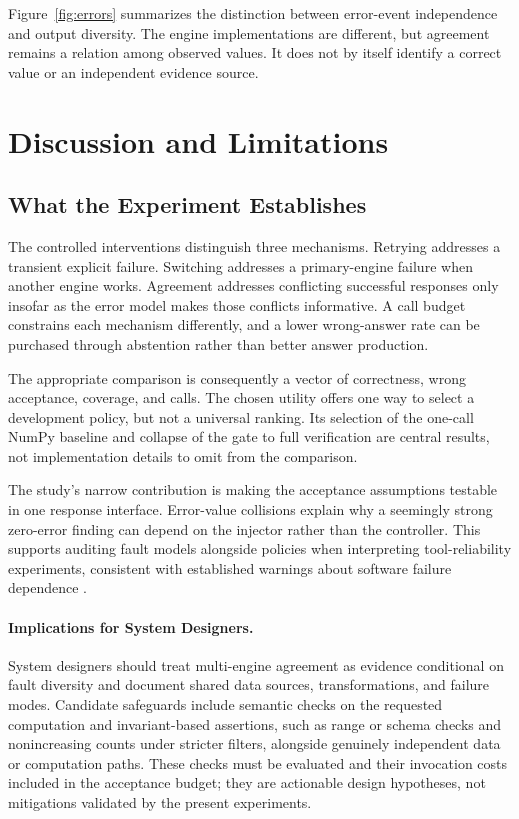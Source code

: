 \documentclass{svproc}
\begin{document}
Figure~\ref{fig:errors} summarizes the distinction between error-event independence and output diversity. The engine implementations are different, but agreement remains a relation among observed values. It does not by itself identify a correct value or an independent evidence source.

\FloatBarrier
\section{Discussion and Limitations}
\subsection{What the Experiment Establishes}
The controlled interventions distinguish three mechanisms. Retrying addresses a transient explicit failure. Switching addresses a primary-engine failure when another engine works. Agreement addresses conflicting successful responses only insofar as the error model makes those conflicts informative. A call budget constrains each mechanism differently, and a lower wrong-answer rate can be purchased through abstention rather than better answer production.

The appropriate comparison is consequently a vector of correctness, wrong acceptance, coverage, and calls. The chosen utility offers one way to select a development policy, but not a universal ranking. Its selection of the one-call NumPy baseline and collapse of the gate to full verification are central results, not implementation details to omit from the comparison.

The study's narrow contribution is making the acceptance assumptions testable in one response interface. Error-value collisions explain why a seemingly strong zero-error finding can depend on the injector rather than the controller. This supports auditing fault models alongside policies when interpreting tool-reliability experiments, consistent with established warnings about software failure dependence \cite{knight1986}.

\paragraph{Implications for System Designers.}
System designers should treat multi-engine agreement as evidence conditional on fault diversity and document shared data sources, transformations, and failure modes. Candidate safeguards include semantic checks on the requested computation and invariant-based assertions, such as range or schema checks and nonincreasing counts under stricter filters, alongside genuinely independent data or computation paths. These checks must be evaluated and their invocation costs included in the acceptance budget; they are actionable design hypotheses, not mitigations validated by the present experiments.
\end{document}

